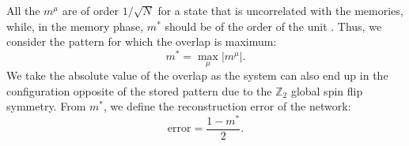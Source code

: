 All the $m^\mu$ are of order $1/\sqrt{N}$ for a state that is uncorrelated with the memories, while, in the memory phase, $m^*$ should be of the order of the unit \cite{Sompolinsky1988}. Thus, we consider the pattern for which the overlap is maximum:
\begin{equation}
m^* = \max\limits_\mu |m^\mu|.
\end{equation}
We take the absolute value of the overlap as the system can also end up in the configuration opposite of the stored pattern due to the $\mathbb{Z}_2$ global spin flip symmetry.  From $m^*$, we define the reconstruction error of the network:
\begin{equation}
    \text{error}=\frac{1-m^*}{2}.
\end{equation}
